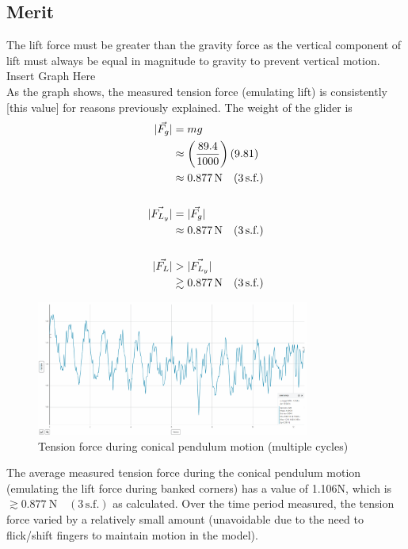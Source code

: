 \documentclass[11pt, a4paper]{article}
\begin{document}
	\subsection{Merit}
	The lift force must be greater than the gravity force as the vertical component of lift must always be equal in magnitude to gravity to prevent vertical motion.\\
	Insert Graph Here\\
	As the graph shows, the measured tension force (emulating lift) is consistently [this value] for reasons previously explained.
	The weight of the glider is
	\begin{align}
		|\vec{F_g}|&=mg\\
		&\approx \left(\frac{89.4}{1000}\right)(9.81)\\
		&\approx \SI{0.877}{\newton} \quad (3\, \text{s.f.})\\[\baselineskip]
		|\vec{F_{L_y}}|&=|\vec{F_g}|\\
		&\approx \SI{0.877}{\newton} \quad (3\, \text{s.f.})\\[\baselineskip]
		|\vec{F_L}|&>|\vec{F_{L_y}}|\\
		&\gtrsim\SI{0.877}{\newton} \quad (3\, \text{s.f.})
	\end{align}
	
	\begin{figure}[H]
		\centering
		\includegraphics[width=0.8\textwidth]{Images/Conical Pendulum}
		\caption{Tension force during conical pendulum motion (multiple cycles)}
	\end{figure}
	The average measured tension force during the conical pendulum motion (emulating the lift force during banked corners) has a value of 1.106N, which is $\gtrsim\SI{0.877}{\newton} \quad (3\, \text{s.f.})$ as calculated. Over the time period measured, the tension force varied by a relatively small amount (unavoidable due to the need to flick/shift fingers to maintain motion in the model).
	
	
	
\end{document}
